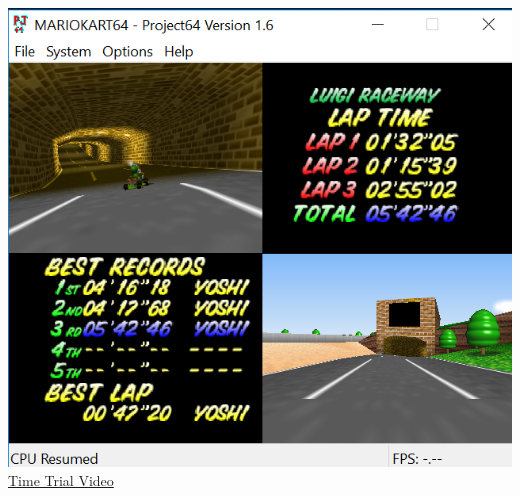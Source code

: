 \documentclass[12pt]{article}
\begin{document}
 				\begin{center}
					\includegraphics[scale=0.7]{mario.png}\\
					\href{https://drive.google.com/open?id=1dnGApt-1-puP1PLlY33D6uRe2Z6nUfDU}
					{Time Trial Video}
 				\end{center}
\end{document}
